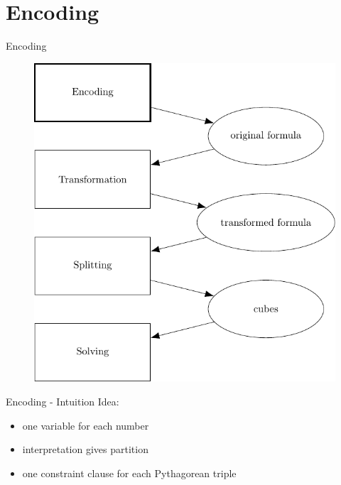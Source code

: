\documentclass[c,8pt,xcolor...,x11names,usenames,dvipsnames]{beamer}
\begin{document}
\section{Encoding}

\begin{frame}{Encoding}
	\begin{figure}
		\includegraphics[scale=0.65]{images/framework1}
	\end{figure}
\end{frame}

\begin{frame}{Encoding - Intuition}
	Idea:
	\begin{itemize}
		\item one variable for each number
		\pause
		\item interpretation gives partition
		\pause
		\item one constraint clause for each Pythagorean triple
	\end{itemize}
\end{frame}
\end{document}
